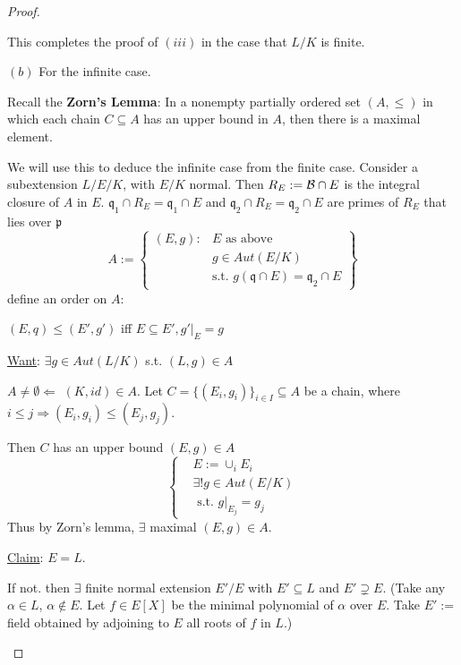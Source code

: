 \documentclass[11pt]{article}
\newcommand{\scp}{{\mathfrak p}}
\newcommand{\scq}{\mathfrak q}
\newcommand{\calb}{{\cal B}}
\newcommand{\Lrta}{\Longrightarrow}
\newcommand{\Llta}{\Longleftarrow}
\begin{document}
\begin{proof}
\begin{enumerate}[label=(\roman*)]
This completes the proof of $(iii)$ in the case that $L/K$ is finite.

$(b)$ For the infinite case.

Recall the \textbf{Zorn's Lemma}: In a nonempty partially ordered set $(A,\leq) $ in which each chain $C\subseteq A$ has an upper bound in $A$, then there is a maximal element.

We will use this to deduce the infinite case from the finite case. Consider a subextension $L/E/K$, with $E/K$ normal. Then $R_E:=\calb\cap E$ is the integral closure of $A$ in $E$. $\scq_1\cap R_E=\scq_1\cap E$ and $\scq_2\cap R_E=\scq_2\cap E$ are primes of $R_E$ that lies over $\scp$
$$
A:=\left\{
\begin{aligned}
(E,g):& E \text{ as above }\\
& g\in Aut(E/K)\\
&\text{s.t. } g(\scq\cap E)=\scq_2\cap E
\end{aligned}
\right\}
$$
define an order on $A$:

 $(E,q)\leq (E',g')$ iff $E\subseteq E', g'|_E=g$

\underline{Want}: $\exists g\in Aut(L/K)$ s.t. $(L,g)\in A$ 

$A\neq \emptyset\Llta$ $(K,id) \in A$. Let $C=\{(E_i,g_i)\}_{i\in I}\subseteq A$ be a chain, where $i\leq j\Lrta (E_i,g_i)\leq (E_j,g_j)$.

Then $C$ has an upper bound $(E,g)\in A$
$$
\left\{
\begin{aligned}
& E:=\cup_i E_i\\
& \exists ! g\in Aut(E/K)\\
& \text{ s.t. } g|_{E_j}=g_j
\end{aligned}
\right.
$$
Thus by Zorn's lemma, $\exists $ maximal $(E,g)\in A$. 

\underline{Claim}: $E=L$.

If not. then $\exists $ finite normal extension $E'/E$ with $E'\subseteq L$ and $E'\supsetneq E.$ (Take any $\alpha\in L$, $\alpha\notin E$. Let $f\in E[X]$ be the minimal polynomial of $\alpha$ over $E$. Take $E':=$ field obtained by adjoining to $E$ all roots of $f$ in $L$.)


\end{enumerate}
\end{proof}
\end{document}
